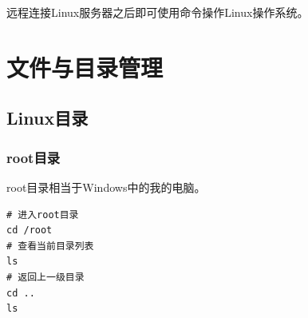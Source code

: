 \documentclass[12pt, openany, oneside]{book}
\begin{document}
远程连接Linux服务器之后即可使用命令操作Linux操作系统。 \\

\newpage

\chapter{文件与目录管理}

\section{Linux目录}

\subsection{root目录}

root目录相当于Windows中的我的电脑。

\vspace{-0.5cm}
\begin{lstlisting}
# 进入root目录
cd /root
# 查看当前目录列表
ls
# 返回上一级目录
cd ..
ls
\end{lstlisting}
\end{document}
